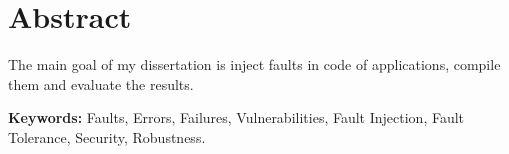 \newpage
{}

\section*{Abstract}

The main goal of my dissertation is inject faults in code of applications, compile them and evaluate the results.




\textbf{Keywords:} Faults, Errors, Failures, Vulnerabilities, Fault Injection, Fault Tolerance, Security, Robustness.
